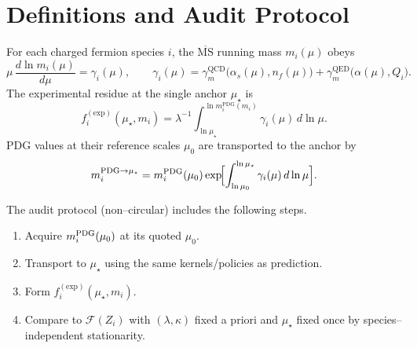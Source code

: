 \documentclass[aps,prd,onecolumn,amsmath,amssymb,superscriptaddress,nofootinbib,showpacs,showkeys]{revtex4-2}
\renewcommand\thesection{\Roman{section}}
\renewcommand\thesubsection{\thesection\arabic{subsection}}
\providecommand*{\theHequation}{\arabic{section}.\arabic{equation}}
\begin{document}
\newpage
\clearpage

\appendix
\makeatletter
\renewcommand\thesection{\Alph{section}}
\renewcommand\thesubsection{\thesection\arabic{subsection}}
\renewcommand*{\theHequation}{\thesection.\arabic{equation}}
\makeatother
\section{ Definitions and Audit Protocol}\label{app:A}   %

For each charged fermion species $i$, the $\overline{\mathrm{MS}}$ running mass $m_i(\mu)$ obeys
\[
\mu\,\frac{d\ln m_i(\mu)}{d\mu}=\gamma_i(\mu),\qquad \gamma_i(\mu)=\gamma_m^{\mathrm{QCD}}\bigl(\alpha_s(\mu),n_f(\mu)\bigr)+\gamma_m^{\mathrm{QED}}\bigl(\alpha(\mu),Q_i\bigr).
\]
The experimental residue at the single anchor $\mu_\star$ is
\[
f_i^{\mathrm{(exp)}}(\mu_\star,m_i)=\lambda^{-1}\!\int_{\ln\mu_\star}^{\ln m_i^{\mathrm{PDG}}(m_i)}\gamma_i(\mu)\,d\ln\mu.
\]
PDG values at their reference scales $\mu_0$ are transported to the anchor by
\begin{equation}
m_i^{\rm PDG\to\mu_\star}=m_i^{\rm PDG}(\mu_0)\exp\!\Bigl[\int_{\ln\mu_0}^{\ln\mu_\star}\gamma_i(\mu)\,d\ln\mu\Bigr].
\label{eq:pdg-transport}
\end{equation}

The audit protocol (non–circular) includes the following steps. 
\begin{enumerate}%
  \item Acquire $m_i^{\rm PDG}(\mu_0)$ at its quoted $\mu_0$.
  \item Transport to $\mu_\star$ using the same kernels/policies as prediction.
  \item Form $f_i^{\mathrm{(exp)}}(\mu_\star,m_i)$.
  \item Compare to $\mathcal F(Z_i)$ with $(\lambda,\kappa)$ fixed a priori and $\mu_\star$ fixed once by species–independent stationarity.
\end{enumerate}

\end{document}
